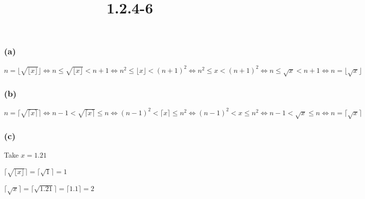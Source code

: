\documentclass{article}
\title{1.2.4-6}
\begin{document}
\maketitle

\subsubsection*{(a)}

$n = \lfloor \sqrt{\lfloor x\rfloor} \rfloor \iff n \leq \sqrt{\lfloor x\rfloor} < n + 1 \iff n^2 \leq \lfloor x\rfloor < (n+1)^2 \iff n^2 \leq x < (n+1)^2 \iff n \leq \sqrt{x} < n + 1 \iff n = \lfloor \sqrt{x} \rfloor$

\subsubsection*{(b)}

$n = \lceil \sqrt{\lceil x\rceil} \rceil \iff n - 1 < \sqrt{\lceil x\rceil} \leq n \iff (n-1)^2 < \lceil x\rceil \leq n^2 \iff (n-1)^2 < x \leq n^2 \iff n - 1 < \sqrt{x} \leq n \iff n = \lceil \sqrt{x} \rceil$

\subsubsection*{(c)}

Take $x = 1.21$

$\lceil \sqrt{\lfloor x\rfloor} \rceil = \lceil \sqrt{1} \rceil = 1$

$\lceil \sqrt{x} \rceil = \lceil \sqrt{1.21} \rceil = \lceil 1.1 \rceil = 2$
\end{document}
